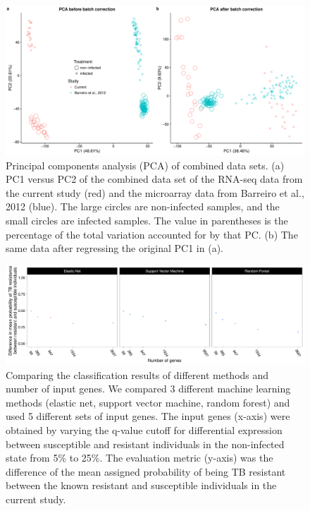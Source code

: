 \documentclass[fleqn,10pt]{wlscirep}
\begin{document}
\begin{figure}[ht]
\centering
\includegraphics[width=\linewidth]{../figure/combined-pca.pdf}
\caption{
Principal components analysis (PCA) of combined data sets. (a) PC1
versus PC2 of the combined data set of the RNA-seq data from the
current study (red) and the microarray data from Barreiro et al., 2012
\cite{Barreiro2012} (blue). The large circles are non-infected
samples, and the small circles are infected samples. The value in
parentheses is the percentage of the total variation accounted for by
that PC. (b) The same data after regressing the original PC1 in (a).
}
\label{fig:combined-pca}
\end{figure}

\begin{figure}[ht]
\centering
\includegraphics[width=\linewidth]{../figure/classifier-compare.pdf}
\caption{
Comparing the classification results of different methods and number
of input genes. We compared 3 different machine learning methods
(elastic net, support vector machine, random forest) and used 5
different sets of input genes. The input genes (x-axis) were obtained
by varying the q-value cutoff for differential expression between
susceptible and resistant individuals in the non-infected state from
5\% to 25\%. The evaluation metric (y-axis) was the difference of the
mean assigned probability of being TB resistant between the known
resistant and susceptible individuals in the current study.
}
\label{fig:class-compare}
\end{figure}
\end{document}
